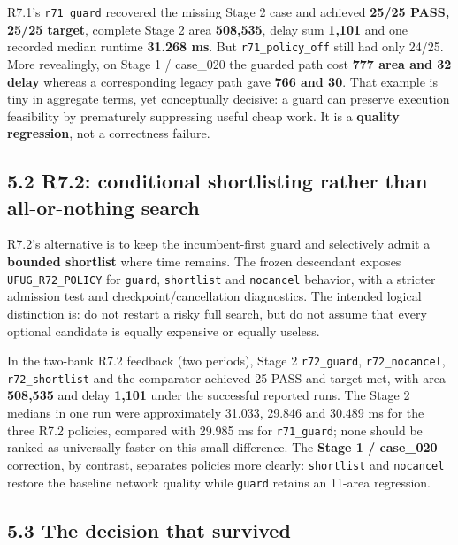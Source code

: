 R7.1's \texttt{r71\_guard} recovered the missing Stage 2 case and achieved \textbf{25/25 PASS, 25/25 target}, complete Stage 2 area \textbf{508,535}, delay sum \textbf{1,101} and one recorded median runtime \textbf{31.268 ms}. But \texttt{r71\_policy\_off} still had only 24/25. More revealingly, on Stage 1 / case\_020 the guarded path cost \textbf{777 area and 32 delay} whereas a corresponding legacy path gave \textbf{766 and 30}. That example is tiny in aggregate terms, yet conceptually decisive: a guard can preserve execution feasibility by prematurely suppressing useful cheap work. It is a \textbf{quality regression}, not a correctness failure.

\subsection{5.2 R7.2: conditional shortlisting rather than all-or-nothing search}\label{r7.2-conditional-shortlisting-rather-than-all-or-nothing-search}

R7.2's alternative is to keep the incumbent-first guard and selectively admit a \textbf{bounded shortlist} where time remains. The frozen descendant exposes \texttt{UFUG\_R72\_POLICY} for \texttt{guard}, \texttt{shortlist} and \texttt{nocancel} behavior, with a stricter admission test and checkpoint/cancellation diagnostics. The intended logical distinction is: do not restart a risky full search, but do not assume that every optional candidate is equally expensive or equally useless.

In the two-bank R7.2 feedback (two periods), Stage 2 \texttt{r72\_guard}, \texttt{r72\_nocancel}, \texttt{r72\_shortlist} and the comparator achieved 25 PASS and target met, with area \textbf{508,535} and delay \textbf{1,101} under the successful reported runs. The Stage 2 medians in one run were approximately 31.033, 29.846 and 30.489 ms for the three R7.2 policies, compared with 29.985 ms for \texttt{r71\_guard}; none should be ranked as universally faster on this small difference. The \textbf{Stage 1 / case\_020} correction, by contrast, separates policies more clearly: \texttt{shortlist} and \texttt{nocancel} restore the baseline network quality while \texttt{guard} retains an 11-area regression.

\subsection{5.3 The decision that survived}\label{the-decision-that-survived}

